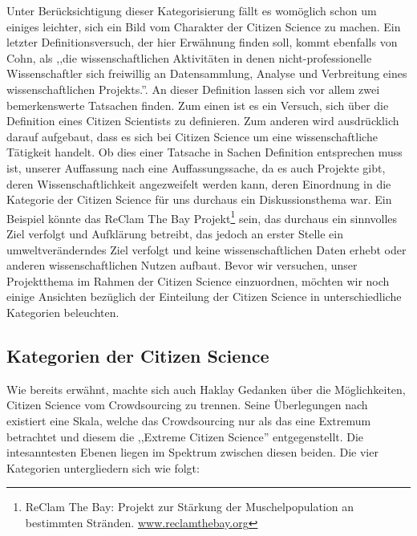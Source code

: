 \documentclass{article}
\begin{document}
Unter Berücksichtigung dieser Kategorisierung fällt es womöglich schon um einiges leichter, sich ein Bild vom Charakter der Citizen Science zu machen. Ein letzter Definitionsversuch, der hier Erwähnung finden soll, kommt ebenfalls von Cohn, als ,,die wissenschaftlichen Aktivitäten in denen nicht-professionelle Wissenschaftler sich freiwillig an Datensammlung, Analyse und Verbreitung eines wissenschaftlichen Projekts.''\cite{Cohn}. An dieser Definition lassen sich vor allem zwei bemerkenswerte Tatsachen finden. Zum einen ist es ein Versuch, sich über die Definition eines Citizen Scientists zu definieren. Zum anderen wird ausdrücklich darauf aufgebaut, dass es sich bei Citizen Science um eine wissenschaftliche Tätigkeit handelt. Ob dies einer Tatsache in Sachen Definition entsprechen muss ist, unserer Auffassung nach eine Auffassungssache, da es auch Projekte gibt, deren Wissenschaftlichkeit angezweifelt werden kann, deren Einordnung in die Kategorie der Citizen Science für uns durchaus ein Diskussionsthema war. Ein Beispiel könnte das ReClam The Bay Projekt\footnote{ReClam The Bay: Projekt zur Stärkung der Muschelpopulation an bestimmten Stränden. \url{www.reclamthebay.org}} sein, das durchaus ein sinnvolles Ziel verfolgt und Aufklärung betreibt, das jedoch an erster Stelle ein umweltveränderndes Ziel verfolgt und keine wissenschaftlichen Daten erhebt oder anderen wissenschaftlichen Nutzen aufbaut.
\newline
Bevor wir versuchen, unser Projektthema im Rahmen der Citizen Science einzuordnen, möchten wir noch einige Ansichten bezüglich der Einteilung der Citizen Science in unterschiedliche Kategorien beleuchten.

\subsection{Kategorien der Citizen Science}
Wie bereits erwähnt, machte sich auch Haklay Gedanken über die Möglichkeiten, Citizen Science vom Crowdsourcing zu trennen. Seine Überlegungen nach existiert eine Skala, welche das Crowdsourcing nur als das eine Extremum betrachtet und diesem die ,,Extreme Citizen Science'' entgegenstellt. Die intesanntesten Ebenen liegen im Spektrum zwischen diesen beiden. Die vier Kategorien untergliedern sich wie folgt:
\end{document}
